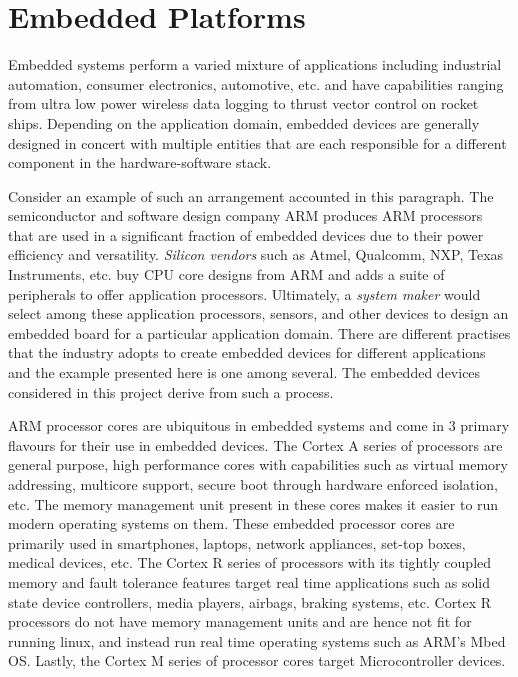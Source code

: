 \section{Embedded Platforms}

Embedded systems perform a varied mixture of applications including industrial automation, consumer electronics, automotive, etc. and have capabilities ranging from ultra low power wireless data logging to thrust vector control on rocket ships. Depending on the application domain, embedded devices are generally designed in concert with multiple entities that are each responsible for a different component in the hardware-software stack.

Consider an example of such an arrangement accounted in this paragraph. The semiconductor and software design company ARM produces ARM processors that are used in a significant fraction of embedded devices due to their power efficiency and versatility. \textit{Silicon vendors} such as Atmel, Qualcomm, NXP, Texas Instruments, etc. buy CPU core designs from ARM and adds a suite of peripherals to offer application processors. Ultimately, a \textit{system maker} would select among these application processors, sensors, and other devices to design an embedded board for a particular application domain. There are different practises that the industry adopts to create embedded devices for different applications and the example presented here is one among several. The embedded devices considered in this project derive from such a process.

ARM processor cores are ubiquitous in embedded systems and come in 3 primary flavours for their use in embedded devices. The Cortex A series of processors are general purpose, high performance cores with capabilities such as virtual memory addressing, multicore support, secure boot through hardware enforced isolation, etc. The memory management unit present in these cores makes it easier to run modern operating systems on them. These embedded processor cores are primarily used in smartphones, laptops, network appliances, set-top boxes, medical devices, etc. The Cortex R series of processors with its tightly coupled memory and fault tolerance features target real time applications such as solid state device controllers, media players, airbags, braking systems, etc. Cortex R processors do not have memory management units and are hence not fit for running linux, and instead run real time operating systems such as ARM's Mbed OS. Lastly, the Cortex M series of processor cores target Microcontroller devices.

